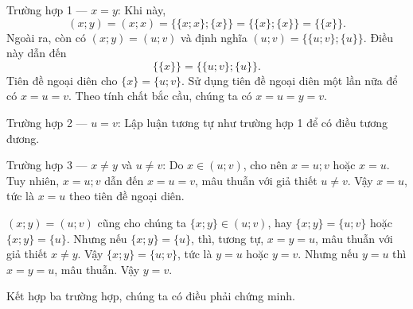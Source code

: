 \textcolor{colorEmphasisCyan}{Trường hợp 1 --- $x = y$}: Khi này, $$(x; y) = (x; x) = \{\{x; x\}; \{x\}\} = \{\{x\}; \{x\}\} = \{\{x\}\}.$$
Ngoài ra, còn có $(x; y) = (u; v)$ và định nghĩa $(u; v) = \{\{u; v\}; \{u\}\}$. Điều này dẫn đến 
$$
\{\{x\}\} = \{\{u; v\}; \{u\}\}.
$$
Tiên đề ngoại diên cho $\{x\} = \{u; v\}$. Sử dụng tiên đề ngoại diên một lần nữa để có $x = u = v$. Theo tính chất bắc cầu, chúng ta có $x = u = y = v$.

\textcolor{colorEmphasis}{Trường hợp 2 --- $u = v$}: Lập luận tương tự như trường hợp 1 để có điều tương đương.

\textcolor{colorEmphasisGreen}{Trường hợp 3 --- $x \neq y$ và $u \neq v$}: Do ${x} \in (u; v)$, cho nên ${x} = {u; v}$ hoặc ${x} = {u}$. Tuy nhiên, ${x} = {u; v}$ dẫn đến $x = u = v$, mâu thuẫn với giả thiết $u \neq v$. Vậy ${x} = {u}$, tức là $x = u$ theo tiên đề ngoại diên.

$(x; y) = (u; v)$ cũng cho chúng ta $\{x; y\} \in (u; v)$, hay $\{x; y\} = \{u; v\}$ hoặc $\{x; y\} = \{u\}$. Nhưng nếu $\{x; y\} = \{u\}$, thì, tương tự, $x = y = u$, mâu thuẫn với giả thiết $x \neq y$. Vậy $\{x; y\} = \{u; v\}$, tức là $y = u$ hoặc $y = v$. Nhưng nếu $y = u$ thì $x = y = u$, mâu thuẫn. Vậy $y = v$. 

Kết hợp ba trường hợp, chúng ta có điều phải chứng minh.